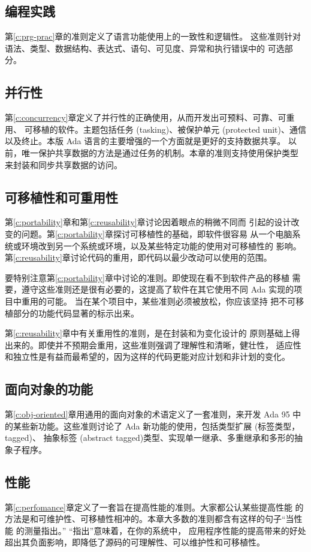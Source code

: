 \subsection{编程实践}
第\ref{c:prg-prac}章的准则定义了语言功能使用上的一致性和逻辑性。
这些准则针对语法、类型、数据结构、表达式、语句、可见度、异常和执行错误中的
可选部分。

\subsection{并行性}
第\ref{c:concurrency}章定义了并行性的正确使用，从而开发出可预料、可靠、可重用、
可移植的软件。主题包括任务 (tasking)、被保护单元 (protected unit)、通信
以及终止。本版 Ada 语言的主要增强的一个方面就是更好的支持数据共享。
以前，唯一保护共享数据的方法是通过任务的机制。本章的准则支持使用保护类型
来封装和同步共享数据的访问。

\subsection{可移植性和可重用性}
第\ref{c:portability}章和第\ref{c:reusability}章讨论因着眼点的稍微不同而
引起的设计改变的问题。第\ref{c:portability}章探讨可移植性的基础，即软件很容易
从一个电脑系统或环境改到另一个系统或环境，以及某些特定功能的使用对可移植性的
影响。第\ref{c:reusability}章讨论代码的重用，即代码以最少改动可以使用的范围。

要特别注意第\ref{c:portability}章中讨论的准则。即使现在看不到软件产品的移植
需要，遵守这些准则还是很有必要的，这提高了软件在其它使用不同 Ada 实现的项
目中重用的可能。 当在某个项目中，某些准则必须被放松，你应该坚持
把不可移植部分的功能代码显著的标示出来。

第\ref{c:reusability}章中有关重用性的准则，是在封装和为变化设计的
原则基础上得出来的。即使并不预期会重用，这些准则强调了理解性和清晰，健壮性，
适应性和独立性是有益而最希望的，因为这样的代码更能对应计划和非计划的变化。

\subsection{面向对象的功能}
第\ref{c:obj-oriented}章用通用的面向对象的术语定义了一套准则，来开发 Ada 95 中
的某些新功能。这些准则讨论了 Ada 新功能的使用，包括类型扩展 (标签类型，tagged)、
抽象标签 (abstract tagged)类型、实现单一继承、多重继承和多形的抽象子程序。

\subsection{性能}
第\ref{c:perfomance}章定义了一套旨在提高性能的准则。大家都公认某些提高性能
的方法是和可维护性、可移植性相冲的。本章大多数的准则都含有这样的句子``当性能
的测量指出。'' ``指出''意味着，在你的系统中， 应用程序性能的提高带来的好处
超出其负面影响，即降低了源码的可理解性、可以维护性和可移植性。

